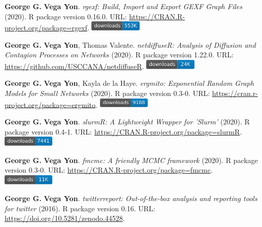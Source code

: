 \documentclass[letterpaper, 11pt]{article}
\begin{document}
\begin{enumerate}[label={[}\arabic*{]},labelindent=5\parindent,labelsep=8pt]
\item {\bfseries George G.} {\bfseries Vega Yon}. \textit{rgexf: Build, Import and Export GEXF Graph Files} (2020). R package version 0.16.0. {\small URL}: \url{https://CRAN.R-project.org/package=rgexf}. \includegraphics[width=2.5cm]{fig/cran-downloads-rgexf.pdf} 
\item {\bfseries George G.} {\bfseries Vega Yon}, Thomas Valente. \textit{{{netdiffuseR: Analysis of Diffusion and Contagion Processes on Networks}}} (2020). R package version 1.22.0. {\small URL}: \url{https://github.com/USCCANA/netdiffuseR}. \includegraphics[width=2.5cm]{fig/cran-downloads-netdiffuser.pdf} 
\item {\bfseries George G.} {\bfseries Vega Yon}, Kayla de la Haye. \textit{ergmito: Exponential Random Graph Models for Small Networks} (2020). R package version 0.3-0. {\small URL}: \url{https://cran.r-project.org/package=ergmito}. \includegraphics[width=2.5cm]{fig/cran-downloads-ergmito.pdf} 
\item {\bfseries George G.} {\bfseries Vega Yon}. \textit{slurmR: A Lightweight Wrapper for 'Slurm'} (2020). R package version 0.4-1. {\small URL}: \url{https://CRAN.R-project.org/package=slurmR}. \includegraphics[width=2.5cm]{fig/cran-downloads-slurmr.pdf} 
\item {\bfseries George G.} {\bfseries Vega Yon}. \textit{fmcmc: A friendly MCMC framework} (2020). R package version 0.3-0. {\small URL}: \url{https://CRAN.R-project.org/package=fmcmc}. \includegraphics[width=2.5cm]{fig/cran-downloads-fmcmc.pdf} 
\item {\bfseries George G.} {\bfseries Vega Yon}. \textit{{twitterreport: Out-of-the-box analysis and 
		reporting tools for twitter}} (2016). R package version 0.16. {\small URL}: \url{https://doi.org/10.5281/zenodo.44528}.  
\end{enumerate}
\end{document}

